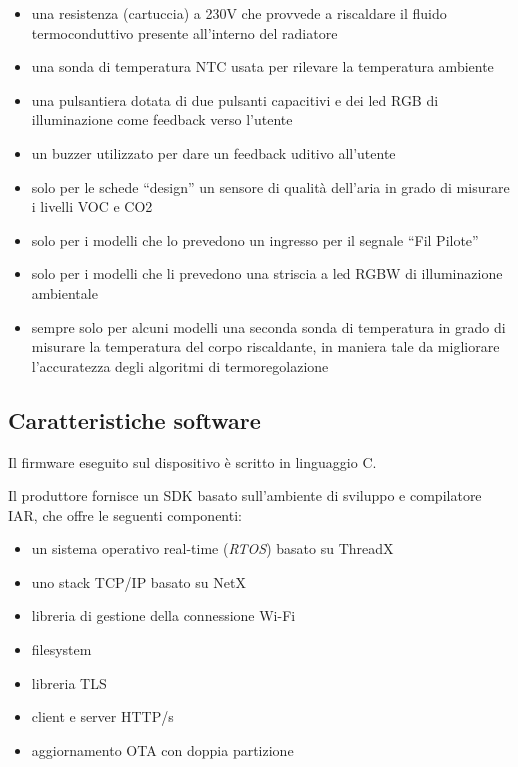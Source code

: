 \documentclass[a4paper,titlepage]{article}
\begin{document}
\begin{itemize}
    \item una resistenza (cartuccia) a 230V che provvede a riscaldare il fluido
        termoconduttivo presente all'interno del radiatore
    \item una sonda di temperatura NTC usata per rilevare la temperatura ambiente
    \item una pulsantiera dotata di due pulsanti capacitivi e dei led RGB di illuminazione
        come feedback verso l'utente
    \item un buzzer utilizzato per dare un feedback uditivo all'utente
    \item solo per le schede ``design'' un sensore di qualità dell'aria in grado di
        misurare i livelli VOC e CO2
    \item solo per i modelli che lo prevedono un ingresso per il segnale ``Fil Pilote''
    \item solo per i modelli che li prevedono una striscia a led RGBW di illuminazione ambientale
    \item sempre solo per alcuni modelli una seconda sonda di temperatura in grado di
        misurare la temperatura del corpo riscaldante, in maniera tale da migliorare
        l'accuratezza degli algoritmi di termoregolazione
\end{itemize}

\subsection{Caratteristiche software}

Il firmware eseguito sul dispositivo è scritto in linguaggio C.

Il produttore fornisce un SDK basato sull'ambiente di sviluppo e compilatore IAR,
che offre le seguenti componenti:

\begin{itemize}
    \item un sistema operativo real-time (\textit{RTOS}) basato su ThreadX
    \item uno stack TCP/IP basato su NetX
    \item libreria di gestione della connessione Wi-Fi
    \item filesystem
    \item libreria TLS
    \item client e server HTTP/s
    \item aggiornamento OTA con doppia partizione
\end{itemize}
\end{document}
